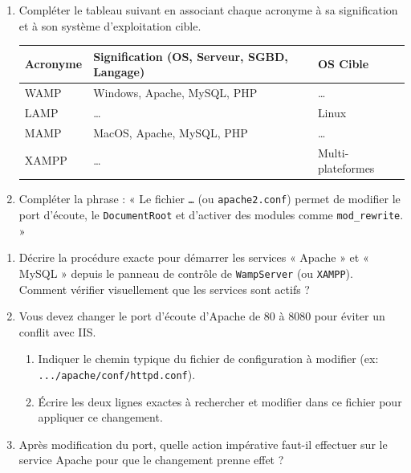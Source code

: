 \documentclass[11pt]{article}
\begin{document}
\begin{exercice}
\begin{enumerate}
    \item Compléter le tableau suivant en associant chaque acronyme à sa signification et à son système d'exploitation cible.
    \begin{tabular}{|l|l|l|}
    \hline
    \textbf{Acronyme} & \textbf{Signification (OS, Serveur, SGBD, Langage)} & \textbf{OS Cible} \\ \hline
    WAMP & Windows, Apache, MySQL, PHP & \ldots \\ \hline
    LAMP & \ldots & Linux \\ \hline
    MAMP & MacOS, Apache, MySQL, PHP & \ldots \\ \hline
    XAMPP & \ldots & Multi-plateformes \\ \hline
    \end{tabular}
    \item Compléter la phrase : « Le fichier \texttt{\ldots} (ou \texttt{apache2.conf}) permet de modifier le port d'écoute, le \texttt{DocumentRoot} et d'activer des modules comme \texttt{mod\_rewrite}. »
\end{enumerate}
\end{exercice}

\begin{exercice}
\begin{enumerate}
    \item Décrire la procédure exacte pour démarrer les services « Apache » et « MySQL » depuis le panneau de contrôle de \texttt{WampServer} (ou \texttt{XAMPP}). Comment vérifier visuellement que les services sont actifs ?
    \item Vous devez changer le port d'écoute d'Apache de 80 à 8080 pour éviter un conflit avec IIS.
    \begin{enumerate}
        \item Indiquer le chemin typique du fichier de configuration à modifier (ex: \texttt{.../apache/conf/httpd.conf}).
        \item Écrire les deux lignes exactes à rechercher et modifier dans ce fichier pour appliquer ce changement.
    \end{enumerate}
    \item Après modification du port, quelle action impérative faut-il effectuer sur le service Apache pour que le changement prenne effet ?
\end{enumerate}
\end{exercice}
\end{document}
